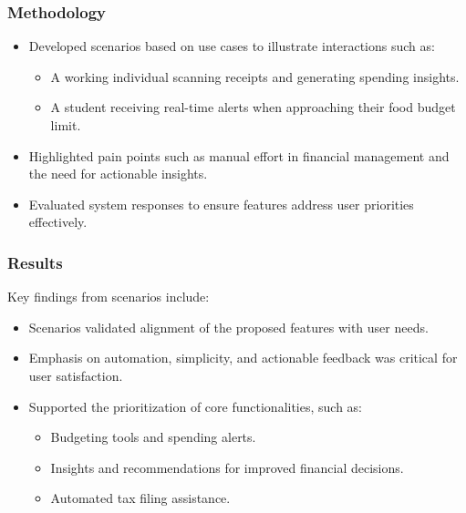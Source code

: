 \subsubsection{Methodology}
\begin{itemize}
    \item Developed scenarios based on use cases to illustrate interactions such as:
        \begin{itemize}
            \item A working individual scanning receipts and generating spending insights.
            \item A student receiving real-time alerts when approaching their food budget limit.
        \end{itemize}
    \item Highlighted pain points such as manual effort in financial management and the need for actionable insights.
    \item Evaluated system responses to ensure features address user priorities effectively.
\end{itemize}

\subsubsection{Results}
Key findings from scenarios include:
\begin{itemize}
    \item Scenarios validated alignment of the proposed features with user needs.
    \item Emphasis on automation, simplicity, and actionable feedback was critical for user satisfaction.
    \item Supported the prioritization of core functionalities, such as:
        \begin{itemize}
            \item Budgeting tools and spending alerts.
            \item Insights and recommendations for improved financial decisions.
            \item Automated tax filing assistance.
        \end{itemize}
\end{itemize}








